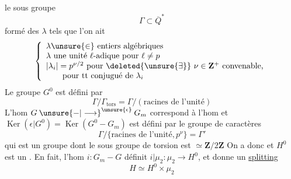 le sous groupe
\[
\Gamma\subset\overline Q^*
\]
formé des $\lambda$ tels que l'on ait
\[
\left\{\begin{array}{l}
\lambda\unsure{\in}\ \text{entiers algébriques}\\
\lambda\ \text{une unité }\ell\text{-adique pour }\ell\ne p\\
|\lambda_i|=p^{\nu/2}\ \text{pour }\deleted{\unsure{\exists}}\ \nu\in\mathbf Z^+\ \text{convenable,}\\
\qquad\text{pour tt conjugué de }\lambda_i
\end{array}\right.
\]
Le groupe $G^0$ est défini par
\[
\Gamma/\Gamma_{\mathrm{tors}}=\Gamma/(\text{racines de l'unité})
\]
L'hom $G\mathbin{\unsure{-|\longrightarrow}^{\unsure{\epsilon}}}G_m$ correspond à l'hom
et $\operatorname{Ker}(\epsilon|G^0)=\operatorname{Ker}(G^0-G_m)$ est défini par le groupe de caractères
\[
\Gamma/\{\text{racines de l'unité},p^\nu\}=\Gamma'
\]
qui est un groupe  dont le sous groupe de torsion est $\simeq\mathbf Z/2\mathbf Z$
On a donc
et $H^0$ est un \uline{}. En fait, l'hom $i:G_m-G$ définit $i|\mu_2:\mu_2\longrightarrow H^0$, et donne un \uline{splitting}
\[
H\simeq H^0\times\mu_2
\]
